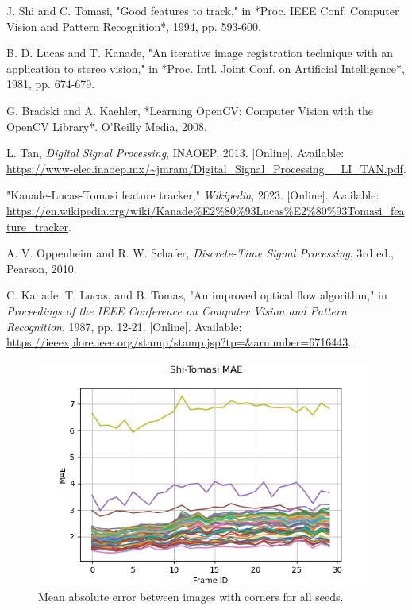 \documentclass[11pt, conference, letterpaper]{IEEEtran}
\begin{document}
\begin{thebibliography}{1}

    J. Shi and C. Tomasi, "Good features to track," in *Proc. IEEE Conf. Computer Vision and Pattern Recognition*, 1994, pp. 593-600.
    
    B. D. Lucas and T. Kanade, "An iterative image registration technique with an application to stereo vision," in *Proc. Intl. Joint Conf. on Artificial Intelligence*, 1981, pp. 674-679.
    
    G. Bradski and A. Kaehler, *Learning OpenCV: Computer Vision with the OpenCV Library*. O'Reilly Media, 2008.
    
    L. Tan, \textit{Digital Signal Processing}, INAOEP, 2013. [Online]. Available: \url{https://www-elec.inaoep.mx/~jmram/Digital_Signal_Processing__LI_TAN.pdf}.
    
    "Kanade-Lucas-Tomasi feature tracker," \textit{Wikipedia}, 2023. [Online]. Available: \url{https://en.wikipedia.org/wiki/Kanade%E2%80%93Lucas%E2%80%93Tomasi_feature_tracker}.
    
    A. V. Oppenheim and R. W. Schafer, \textit{Discrete-Time Signal Processing}, 3rd ed., Pearson, 2010.
    
    C. Kanade, T. Lucas, and B. Tomas, "An improved optical flow algorithm," in \textit{Proceedings of the IEEE Conference on Computer Vision and Pattern Recognition}, 1987, pp. 12-21. [Online]. Available: \url{https://ieeexplore.ieee.org/stamp/stamp.jsp?tp=&arnumber=6716443}.
    
\end{thebibliography}



\begin{figure}[h]
    \centering
    \includegraphics[width=\linewidth]{mc_images/mc_stc_mae.png}
    \caption{Mean absolute error between images with corners for all seeds.}
    \label{fig:mc_stc_mae}
\end{figure}
\end{document}

